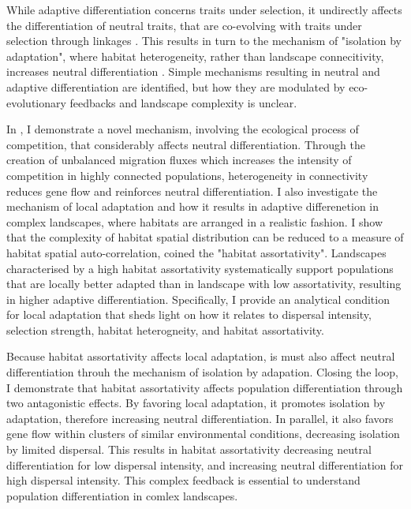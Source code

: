 % 
While adaptive differentiation concerns traits under selection, it undirectly affects the differentiation of neutral traits, that are co-evolving with traits under selection through linkages \cite{XXX}. This results in turn to the mechanism of "isolation by adaptation", where habitat heterogeneity, rather than landscape connecitivity, increases neutral differentiation \cite{nosil2008}. 
% 
Simple mechanisms resulting in neutral and adaptive differentiation are identified, but how they are modulated by eco-evolutionary feedbacks and landscape complexity is unclear. %

In \chapi, I demonstrate a novel mechanism, involving the ecological process of competition, that considerably affects neutral differentiation. Through the creation of unbalanced migration fluxes which increases the intensity of competition in highly connected populations, heterogeneity in connectivity reduces gene flow and reinforces neutral differentiation. %
% 
I also investigate the mechanism of local adaptation and how it results in adaptive differenetion in complex landscapes, where habitats are arranged in a realistic fashion. I show that the complexity of habitat spatial distribution can be reduced to a measure of habitat spatial auto-correlation, coined the "habitat assortativity". Landscapes characterised by a high habitat assortativity systematically support populations that are locally better adapted than in landscape with low assortativity, resulting in higher adaptive differentiation. Specifically, I provide an analytical condition for local adaptation that sheds light on how it relates to dispersal intensity, selection strength, habitat heterogneity, and habitat assortativity.

Because habitat assortativity affects local adaptation, is must also affect neutral differentiation throuh the mechanism of isolation by adapation. Closing the loop, I demonstrate that habitat assortativity affects population differentiation through two antagonistic effects. By favoring local adaptation, it promotes isolation by adaptation, therefore increasing neutral differentiation. In parallel, it also favors gene flow within clusters of similar environmental conditions, decreasing isolation by limited dispersal. This results in habitat assortativity decreasing neutral differentiation for low dispersal intensity, and increasing neutral differentiation for high dispersal intensity.
% 
This complex feedback is essential to understand population differentiation in comlex landscapes.

